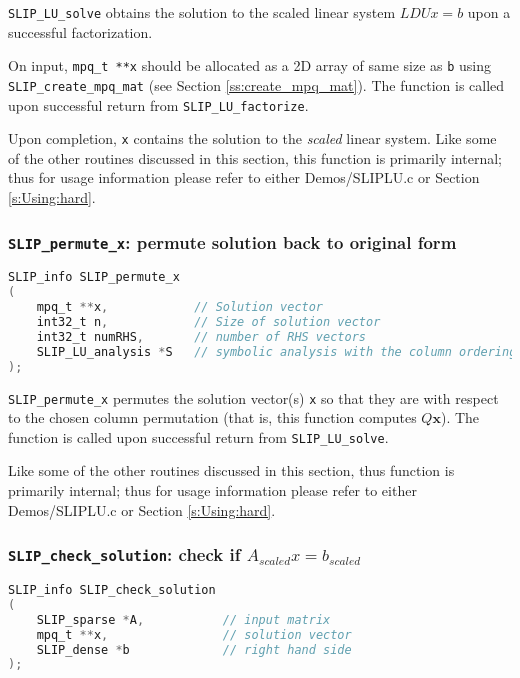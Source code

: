 \documentclass[12pt]{article}
\theoremstyle{definition}
\begin{document}
\verb|SLIP_LU_solve| obtains the solution to the scaled linear system $LDUx=b$ upon a successful factorization.

On input, \verb|mpq_t **x| should be allocated as a 2D array of same size as \verb|b| using \verb|SLIP_create_mpq_mat| (see Section \ref{ss:create_mpq_mat}). The function is called upon successful return from \verb|SLIP_LU_factorize|.

Upon completion, \verb|x| contains the solution to the \textit{scaled} linear system. Like some of the other routines discussed in this section, this function is primarily internal; thus for usage information please refer to either Demos/SLIPLU.c or Section \ref{s:Using:hard}.

\cprotect\subsubsection{\verb|SLIP_permute_x|: permute solution back to original form}\label{ss:SLIP_permute_x}

\begin{lstlisting}[language=C,frame=single]
SLIP_info SLIP_permute_x
(
    mpq_t **x,            // Solution vector
    int32_t n,            // Size of solution vector
    int32_t numRHS,       // number of RHS vectors
    SLIP_LU_analysis *S   // symbolic analysis with the column ordering Q
);
\end{lstlisting}

\verb|SLIP_permute_x| permutes the solution vector(s) \verb|x| so that they are with respect to the chosen column permutation (that is, this function computes $Q \mathbf{x}$). The function is called upon successful return from \verb|SLIP_LU_solve|.


Like some of the other routines discussed in this section, thus function is primarily internal; thus for usage information please refer to either Demos/SLIPLU.c or Section \ref{s:Using:hard}.

\cprotect\subsubsection{\verb|SLIP_check_solution|: check if $A_{scaled}x=b_{scaled}$}


\begin{lstlisting}[language=C,frame=single]
SLIP_info SLIP_check_solution
(
    SLIP_sparse *A,           // input matrix
    mpq_t **x,                // solution vector
    SLIP_dense *b             // right hand side
);
\end{lstlisting}
\end{document}
